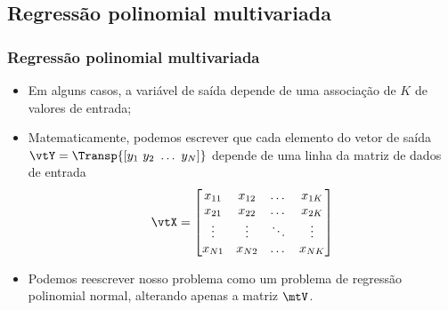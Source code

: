 \subsection{Regressão polinomial multivariada}
\begin{frame}
	\frametitle{Regressão polinomial multivariada}
	\begin{itemize}
		\item Em alguns casos, a variável de saída depende de uma associação de $K$ de valores de entrada;
		\item Matematicamente, podemos escrever que cada elemento do vetor de saída $\vtY = \Transp{\left[y_1 \,\, y_2 \,\, \dots \,\, y_N \right]}$ depende de uma linha da matriz de dados de entrada
		\[
			\vtX = \begin{bmatrix} 
				x_{11} & x_{12} & \dots & x_{1K} \\
				x_{21} & x_{22} & \dots & x_{2K} \\
				\vdots & \vdots & \ddots & \vdots \\
				x_{N1} & x_{N2} & \dots & x_{NK}
			 \end{bmatrix}
		\]
		\item Podemos reescrever nosso problema como um problema de regressão polinomial normal, alterando apenas a matriz $\mtV$.
	\end{itemize}
\end{frame}

